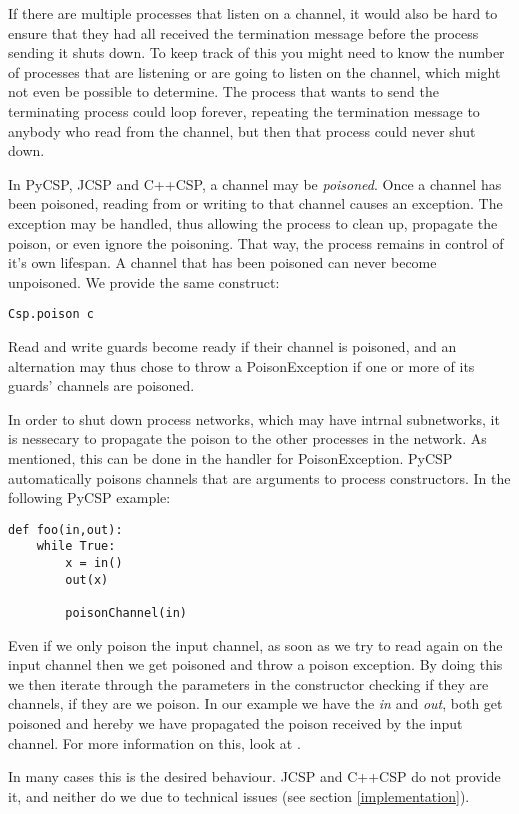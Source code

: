 \documentclass[a4paper,12pt]{article}
\begin{document}
If there are multiple processes that listen on a channel, it would also be hard
to ensure that they had all received the termination message before the process
sending it shuts down. To keep track of this you might need to know the number
of processes that are listening or are going to listen on the channel, which
might not even be possible to determine. The process that wants to send the
terminating process could loop forever, repeating the termination message to
anybody who read from the channel, but then that process could never shut down.

In PyCSP, JCSP and C++CSP, a channel may be \emph{poisoned}. Once a channel
has been poisoned, reading from or writing to that channel causes an exception.
The exception may be handled, thus allowing the process to clean up, propagate
the poison, or even ignore the poisoning. That way, the process remains in
control of it's own lifespan. A channel that has been poisoned can never become
unpoisoned. We provide the same construct:

\begin{verbatim}
Csp.poison c 
\end{verbatim}

Read and write guards become ready if their channel is poisoned, and an
alternation may thus chose to throw a PoisonException if one or more of its
guards' channels are poisoned.

In order to shut down process networks, which may have intrnal subnetworks, it
is nessecary to propagate the poison to the other processes in the network. As
mentioned, this can be done in the handler for PoisonException. PyCSP
automatically poisons channels that are arguments to process constructors. In 
the following PyCSP example:
\begin{verbatim}
def foo(in,out):
    while True:
        x = in()
        out(x)
        
        poisonChannel(in)
\end{verbatim}
Even if we only poison the input channel, as soon as we try to read again on
the input channel then we get poisoned and throw a poison exception. By doing
this we then iterate through the parameters in the constructor checking if
they are channels, if they are we poison. In our example we have the {\it in}
and {\it out}, both get poisoned and hereby we have propagated the poison
received by the input channel. For more information on this, look at
\cite{pycsp}.

In many cases this is the desired behaviour. JCSP and C++CSP do not provide it,
and neither do we due to technical issues (see section \ref{implementation}).
\end{document}
